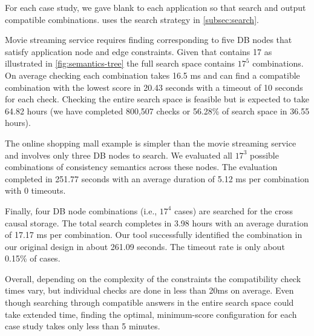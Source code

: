 For each case study, we gave blank \sysmods{} to each application
so that \sysname{} search and output compatible \sysmod{} combinations.
\sysname{} uses the search strategy in \cref{subsec:search}.

Movie streaming service requires finding \sysmods{} corresponding to
five DB nodes that satisfy application node and edge constraints.
Given that \sysname{} contains 17 \sysmods{} as illustrated in
\cref{fig:semantics-tree} the full search space contains
$17^5$ combinations. On average checking each combination
takes 16.5 ms and can find a compatible combination with the lowest
score in 20.43 seconds with a timeout of 10 seconds for each check.
Checking the entire search space is feasible but is expected to take
64.82 hours (we have completed 800,507 checks or 56.28\% of search space
in 36.55 hours).

The online shopping mall example is simpler than the movie streaming service
and involves only three DB nodes to search.
We evaluated all $17^3$ possible combinations of consistency semantics across
these nodes. The evaluation completed in 251.77 seconds with an average
duration of 5.12 ms per combination with 0 timeouts.

Finally, four DB node combinations (i.e., $17^4$ cases) are searched for
the cross causal storage. The total search completes in 3.98 hours
with an average duration of 17.17 ms per combination.
Our tool successfully identified the combination in our original design
in about 261.09 seconds. The timeout rate is only about 0.15\% of cases.

Overall, depending on the complexity of the constraints the
compatibility check times
vary, but individual checks are done in less than 20ms on average. Even though
searching through compatible answers in the entire search space could
take extended
time, finding the optimal, minimum-score configuration for each case
study takes only less than 5 minutes.


